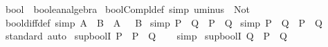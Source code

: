 \begin{isabellebody}
\endisatagproof
{\isafoldproof}%
%
\isadelimproof
\isanewline
%
\endisadelimproof
\isanewline
{}\isamarkupfalse%
%
\isadelimdocument
%
\endisadelimdocument
%
\isatagdocument
%
\isamarkuptrue%
%
\endisatagdocument
{\isafolddocument}%
%
\isadelimdocument
%
\endisadelimdocument
{}\isamarkupfalse%
\ bool\ {\isacharcolon}{\kern0pt}{\isacharcolon}{\kern0pt}\ boolean{\isacharunderscore}{\kern0pt}algebra\isanewline
{}\isanewline
\isanewline
{}\isamarkupfalse%
\ bool{\isacharunderscore}{\kern0pt}Compl{\isacharunderscore}{\kern0pt}def\ {\isacharbrackleft}{\kern0pt}simp{\isacharbrackright}{\kern0pt}{\isacharcolon}{\kern0pt}\ {\isachardoublequoteopen}uminus\ {\isacharequal}{\kern0pt}\ Not{\isachardoublequoteclose}\isanewline
\isanewline
{}\isamarkupfalse%
\ bool{\isacharunderscore}{\kern0pt}diff{\isacharunderscore}{\kern0pt}def\ {\isacharbrackleft}{\kern0pt}simp{\isacharbrackright}{\kern0pt}{\isacharcolon}{\kern0pt}\ {\isachardoublequoteopen}A\ {\isacharminus}{\kern0pt}\ B\ {\isasymlongleftrightarrow}\ A\ {\isasymand}\ {\isasymnot}\ B{\isachardoublequoteclose}\isanewline
\isanewline
{}\isamarkupfalse%
\ {\isacharbrackleft}{\kern0pt}simp{\isacharbrackright}{\kern0pt}{\isacharcolon}{\kern0pt}\ {\isachardoublequoteopen}P\ {\isasymsqinter}\ Q\ {\isasymlongleftrightarrow}\ P\ {\isasymand}\ Q{\isachardoublequoteclose}\isanewline
\isanewline
{}\isamarkupfalse%
\ {\isacharbrackleft}{\kern0pt}simp{\isacharbrackright}{\kern0pt}{\isacharcolon}{\kern0pt}\ {\isachardoublequoteopen}P\ {\isasymsqunion}\ Q\ {\isasymlongleftrightarrow}\ P\ {\isasymor}\ Q{\isachardoublequoteclose}\isanewline
\isanewline
{}\isamarkupfalse%
%
\isadelimproof
\ %
\endisadelimproof
%
\isatagproof
{}\isamarkupfalse%
\ standard\ auto%
\endisatagproof
{\isafoldproof}%
%
\isadelimproof
%
\endisadelimproof
\isanewline
\isanewline
{}\isamarkupfalse%
\isanewline
\isanewline
{}\isamarkupfalse%
\ sup{\isacharunderscore}{\kern0pt}boolI{}{\isacharcolon}{\kern0pt}\ {\isachardoublequoteopen}P\ {\isasymLongrightarrow}\ P\ {\isasymsqunion}\ Q{\isachardoublequoteclose}\isanewline
%
\isadelimproof
\ \ %
\endisadelimproof
%
\isatagproof
{}\isamarkupfalse%
\ simp%
\endisatagproof
{\isafoldproof}%
%
\isadelimproof
\isanewline
%
\endisadelimproof
\isanewline
{}\isamarkupfalse%
\ sup{\isacharunderscore}{\kern0pt}boolI{}{\isacharcolon}{\kern0pt}\ {\isachardoublequoteopen}Q\ {\isasymLongrightarrow}\ P\ {\isasymsqunion}\ Q{\isachardoublequoteclose}\isanewline

\end{isabellebody}
